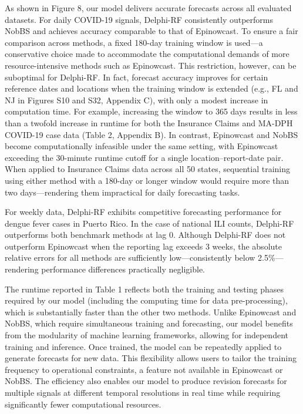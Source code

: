 As shown in Figure 8, our model delivers accurate forecasts across all evaluated datasets. For daily COVID-19 signals, Delphi-RF consistently outperforms NobBS and achieves accuracy comparable to that of Epinowcast. To ensure a fair comparison across methods, a fixed 180-day training window is used—a conservative choice made to accommodate the computational demands of more resource-intensive methods such as Epinowcast. This restriction, however, can be suboptimal for Delphi-RF. In fact, forecast accuracy improves for certain reference dates and locations when the training window is extended (e.g., FL and NJ in Figures S10 and S32, Appendix C), with only a modest increase in computation time. For example, increasing the window to 365 days results in less than a twofold increase in runtime for both the Insurance Claims and MA-DPH COVID-19 case data (Table 2, Appendix B). In contrast, Epinowcast and NobBS become computationally infeasible under the same setting, with Epinowcast exceeding the 30-minute runtime cutoff for a single location–report-date pair. When applied to Insurance Claims data across all 50 states, sequential training using either method with a 180-day or longer window would require more than two days—rendering them impractical for daily forecasting tasks.

For weekly data, Delphi-RF exhibits competitive forecasting performance for dengue fever cases in Puerto Rico. In the case of national ILI counts, Delphi-RF outperforms both benchmark methods at lag 0. Although Delphi-RF does not outperform Epinowcast when the reporting lag exceeds 3 weeks, the absolute relative errors for all methods are sufficiently low—consistently below 2.5\%—rendering performance differences practically negligible.

The runtime reported in Table 1 reflects both the training and testing phases required by our model (including the computing time for data pre-processing), which is substantially faster than the other two methods. Unlike Epinowcast and NobBS, which require simultaneous training and forecasting, our model benefits from the modularity of machine learning frameworks, allowing for independent training and inference. Once trained, the model can be repeatedly applied to generate forecasts for new data. This flexibility allows users to tailor the training frequency to operational constraints, a feature not available in Epinowcast or NobBS. The efficiency also enables our model to produce revision forecasts for multiple signals at different temporal resolutions in real time while requiring significantly fewer computational resources. 






